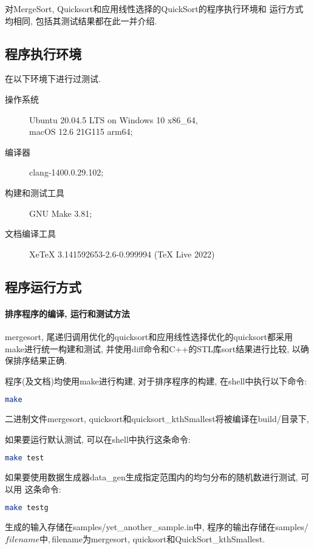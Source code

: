 对MergeSort, Quicksort和应用线性选择的QuickSort的程序执行环境和
运行方式均相同, 包括其测试结果都在此一并介绍.

\subsection{程序执行环境}
在以下环境下进行过测试.
\begin{description}
	\item[操作系统] Ubuntu 20.04.5 LTS on Windows 10 x86\_64, \\
		macOS 12.6 21G115 arm64;
	\item[编译器] clang-1400.0.29.102;
	\item[构建和测试工具] GNU Make 3.81;
	\item[文档编译工具] XeTeX 3.141592653-2.6-0.999994 (TeX Live 2022)
\end{description}

\subsection{程序运行方式}
\paragraph{排序程序的编译, 运行和测试方法}
mergesort, 尾递归调用优化的quicksort和应用线性选择优化的quicksort都采用
make进行统一构建和测试, 并使用diff命令和C++的STL库sort结果进行比较,
以确保排序结果正确.\par

程序(及文档)均使用make进行构建, 对于排序程序的构建, 在shell中执行以下命令:
\begin{lstlisting}[language=bash]
make
\end{lstlisting}
二进制文件mergesort, quicksort和quicksort\_kthSmallest将被编译在build/目录下,

如果要运行默认测试, 可以在shell中执行这条命令:
\begin{lstlisting}[language=bash]
make test
\end{lstlisting}

如果要使用数据生成器data\_gen生成指定范围内的均匀分布的随机数进行测试, 可以用
这条命令:
\begin{lstlisting}[language=bash]
make testg
\end{lstlisting}
生成的输入存储在samples/yet\_another\_sample.in中, 程序的输出存储在samples/
${filename} 中, ${filename}为mergesort, quicksort和QuickSort\_kthSmallest.\par

